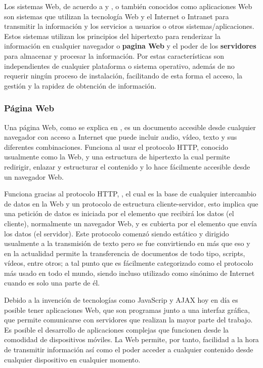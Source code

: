 Los sistemas Web, de acuerdo a \cite{SistWeb1} y \cite{wiki:systemWeb}, o
también conocidos como aplicaciones Web son sistemas que
utilizan la tecnología Web y el Internet o Intranet para transmitir la
información y los
servicios a usuarios o otros sistemas/aplicaciones. Estos sistemas utilizan los
principios del hipertexto para renderizar la información en cualquier
navegador o \textbf{pagina Web} y el poder de los \textbf{servidores} para
almacenar y procesar la información. Por estas características son independientes
de cualquier plataforma o sistema operativo, además de  no requerir ningún
proceso de instalación, facilitando de esta forma el acceso, la gestión y la
rapidez de obtención de información.



\subsubsection*{Página Web}
Una página Web, como se explica en \cite{webpageMozila},  es un documento
accesible desde cualquier navegador con acceso
a Internet que puede incluir audio, vídeo, texto y sus diferentes
combinaciones.
Funciona al usar el protocolo HTTP, conocido usualmente como la Web, y una
estructura de hipertexto la cual permite redirigir, enlazar y estructurar el
contenido y lo hace fácilmente accesible desde un navegador Web.

Funciona gracias al protocolo HTTP, ,
el cual es la base de cualquier intercambio de datos en la Web y un protocolo
de estructura cliente-servidor, esto implica que una petición de datos es
iniciada por el elemento que recibirá los datos (el cliente), normalmente un
navegador Web, y es cubierta por el elemento que envía los datos (el servidor).
Este protocolo comenzó siendo estático y dirigido usualmente a la transmisión de
texto pero se fue convirtiendo en más que eso y en la actualidad permite la
transferencia de documentos de todo tipo, scripts, vídeos, entre otros; a tal
punto que es fácilmente categorizado como el protocolo más usado en todo el
mundo, siendo incluso utilizado como sinónimo de Internet cuando es solo una
parte de él.

Debido a la invención de tecnologías como JavaScrip y AJAX hoy en día es
posible tener aplicaciones Web, que son programas junto a una interfaz gráfica,
que permite comunicarse con servidores que realizan la mayor parte del trabajo.
 Es posible el desarrollo de aplicaciones complejas que funcionen desde la
comodidad de dispositivos móviles. La Web permite, por tanto, facilidad a la hora
de transmitir información así como el poder acceder a cualquier contenido desde
cualquier dispositivo en cualquier momento.

